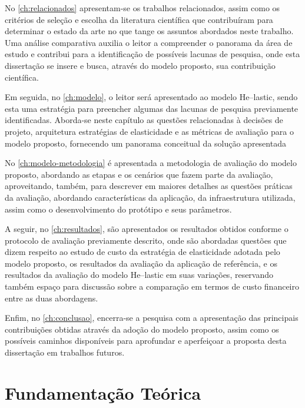 \documentclass[english,brazilian]{UNISINOSmonografia} %
\begin{document}
No \autoref{ch:relacionados} apresentam-se os trabalhos relacionados, assim como os critérios de seleção e escolha da literatura científica que contribuíram para determinar o estado da arte no que tange os assuntos abordados neste trabalho.
Uma análise comparativa auxilia o leitor a compreender o panorama da área de estudo e contribui para a identificação de possíveis lacunas de pesquisa, onde esta dissertação se insere e busca, através do modelo proposto, sua contribuição científica.


Em seguida, no \autoref{ch:modelo}, o leitor será apresentado ao modelo \textsf{He}--lastic, sendo esta uma estratégia para preencher algumas das lacunas de pesquisa previamente identificadas. Aborda-se neste capítulo as questões relacionadas à decisões de projeto, arquitetura estratégias de elasticidade e as métricas de avaliação para o modelo proposto, fornecendo um panorama conceitual da solução apresentada


No \autoref{ch:modelo-metodologia} é apresentada a metodologia de avaliação do modelo proposto, abordando as etapas e os cenários que fazem parte da avaliação, aproveitando, também, para descrever em maiores detalhes as questões práticas da avaliação, abordando características da aplicação, da infraestrutura utilizada, assim como o desenvolvimento do protótipo e seus parâmetros.


A seguir, no \autoref{ch:resultados}, são apresentados os resultados obtidos conforme o protocolo de avaliação previamente descrito, onde são abordadas questões que dizem respeito ao estudo de custo da estratégia de elasticidade adotada pelo modelo proposto, os resultados da avaliação da aplicação de referência, e os resultados da avaliação do modelo \textsf{He}--lastic em suas variações, reservando também espaço para discussão sobre a comparação em termos de custo financeiro entre as duas abordagens.


Enfim, no \autoref{ch:conclusao}, encerra-se a pesquisa com a apresentação das principais contribuições obtidas através da adoção do modelo proposto, assim como os possíveis caminhos disponíveis para aprofundar e aperfeiçoar a proposta desta dissertação em trabalhos futuros.


\chapter{Fundamentação Teórica}
\label{ch:fundamentacao}
\end{document}
